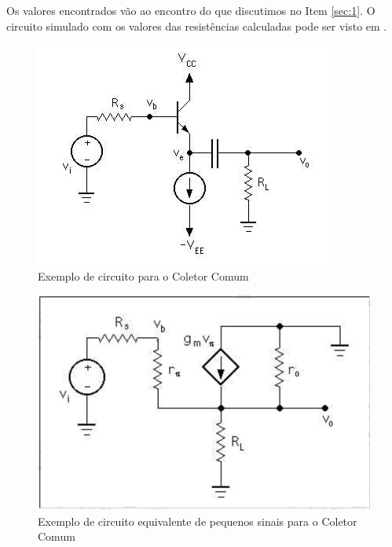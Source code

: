 \documentclass{article}
\begin{document}
            Os valores encontrados vão ao encontro do que discutimos no Item \ref{sec:1}. O circuito simulado com os valores das resistências calculadas pode ser visto em .
        
    \nocite{*}
    
    

    \begin{figure}[!h]
        \centering
        \includegraphics{cc_amp_1.jpg}
        \caption{Exemplo de circuito para o Coletor Comum}
        \label{fig:coletor}
    \end{figure}
    
    \begin{figure}[!h]
        \centering
        \includegraphics{coletorcomum.png}
        \caption{Exemplo de circuito equivalente de pequenos sinais para o Coletor Comum}
        \label{fig:eq_coletor}
    \end{figure}
\end{document}
